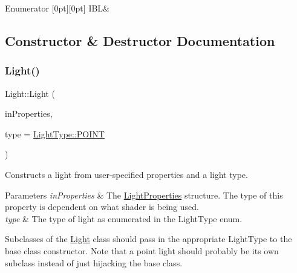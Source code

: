 \begin{DoxyEnumFields}{Enumerator}
[0pt][0pt]{}\hypertarget{class_light_a661d9480e01af8b1612860b9630ef5f8a239e71da0606abd283f2bccf1965badd}{}\label{class_light_a661d9480e01af8b1612860b9630ef5f8a239e71da0606abd283f2bccf1965badd}
I\+BL&\\
\hline

\end{DoxyEnumFields}


\subsection{Constructor \& Destructor Documentation}
\hypertarget{class_light_adca12f0d5470bc3f2e6e77233ab3dcf1}{}\label{class_light_adca12f0d5470bc3f2e6e77233ab3dcf1}
\subsubsection{\texorpdfstring{Light()}{Light()}}
{\footnotesize\ttfamily Light\+::\+Light (\begin{DoxyParamCaption}\item[{std\+::unique\+\_\+ptr$<$ struct \hyperlink{struct_light_properties}{Light\+Properties} $>$}]{in\+Properties,  }\item[{\hyperlink{class_light_a661d9480e01af8b1612860b9630ef5f8}{Light\+Type}}]{type = {\ttfamily \hyperlink{class_light_a661d9480e01af8b1612860b9630ef5f8aaebdbcb765394d25d6a604589a890f82}{Light\+Type\+::\+P\+O\+I\+NT}} }\end{DoxyParamCaption})}



Constructs a light from user-\/specified properties and a light type.


\begin{DoxyParams}{Parameters}
{\em in\+Properties} & The \hyperlink{struct_light_properties}{Light\+Properties} structure. The type of this property is dependent on what shader is being used. \\
\hline
{\em type} & The type of light as enumerated in the Light\+Type enum.\\
\hline
\end{DoxyParams}
Subclasses of the \hyperlink{class_light}{Light} class should pass in the appropriate Light\+Type to the base class constructor. Note that a point light should probably be its own subclass instead of just hijacking the base class. \hypertarget{class_light_ad0e59fad13bb6cfadc25b2c477e9ddc7}{}\label{class_light_ad0e59fad13bb6cfadc25b2c477e9ddc7}
